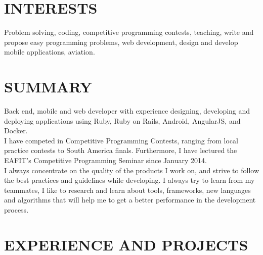 \documentclass[margin, 10pt]{res} %
\begin{document}
\begin{resume}


\section{INTERESTS}

Problem solving, coding, competitive programming contests, teaching, write and propose easy
programming problems, web development, design and develop mobile applications, aviation.


\section{SUMMARY}

Back end, mobile and web developer with experience designing, developing and deploying applications
using Ruby, Ruby on Rails, Android, AngularJS, and Docker. \\
\newline
I have competed in Competitive Programming Contests, ranging from local practice contests to
South America finals. Furthermore, I have lectured the EAFIT's Competitive Programming Seminar
since January 2014. \\
\newline
I always concentrate on the quality of the products I work on, and strive to follow the best
practices and guidelines while developing. I always try to learn from my teammates, I like
to research and learn about tools, frameworks, new languages and algorithms that will help me to
get a better performance in the development process.


\section{EXPERIENCE AND PROJECTS}


\end{resume}
\end{document}
